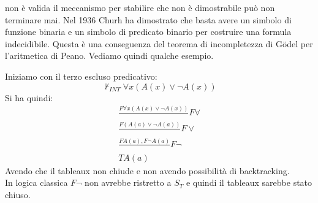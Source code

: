 \documentclass[a4paper,12pt, oneside]{book}
\begin{document}
non è valida il meccanismo per stabilire che non è dimostrabile può non
terminare mai. Nel 1936 Churh ha dimostrato che basta avere un simbolo di
funzione binaria e un simbolo di predicato binario per costruire una formula
indecidibile. Questa è una conseguenza del teorema di incompletezza di
G\"{o}del per l'aritmetica di Peano.
\newpage
Vediamo quindi qualche esempio.
\begin{esempio}
  Iniziamo con il terzo escluso predicativo:
  \[\nvdash_{INT}\forall x(A(x)\lor \neg A(x))\]
  Si ha quindi:
  \begin{gather*}
    \frac{F\forall x(A(x)\lor \neg A(x))}{}F\forall\\
    \frac{F (A(a)\lor \neg A(a))}{}F\lor\\
    \frac{FA(a),F\neg A(a)}{}F\neg\\
    TA(a)
  \end{gather*}
  Avendo che il tableaux non chiude e non avendo possibilità di backtracking.\\
  In logica classica $F\neg$ non avrebbe ristretto a $S_T$ e quindi il tableaux
  sarebbe stato chiuso.
\end{esempio}
\end{document}

